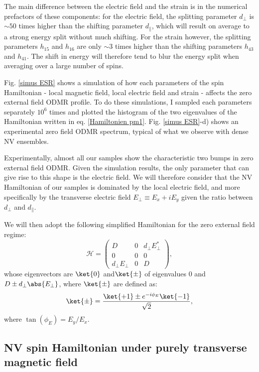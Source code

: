 \documentclass[a4paper,11pt]{report}
\begin{document}
The main difference between the electric field and the strain is in the numerical prefactors of these components: for the electric field, the splitting parameter $d_\perp$ is $\sim 50$ times higher than the shifting parameter $d_\parallel$, which will result on average to a strong energy split without much shifting. For the strain however, the splitting parameters $h_{15}$ and $h_{16}$ are only $\sim 3$ times higher than the shifting parameters $h_{43}$ and $h_{41}$. The shift in energy will therefore tend to blur the energy split when averaging over a large number of spins.

Fig. \ref{simus ESR} shows a simulation of how each parameters of the spin Hamiltonian - local magnetic field, local electric field and strain - affects the zero external field ODMR profile. To do these simulations, I sampled each parameters separately $10^6$ times and plotted the histogram of the two eigenvalues of the Hamiltonian written in eq. \ref{Hamiltonien pm1}. Fig. \ref{simus ESR}-d) shows an experimental zero field ODMR spectrum, typical of what we observe with dense NV ensembles. 

Experimentally, almost all our samples show the characteristic two bumps in zero external field ODMR. Given the simulation results, the only parameter that can give rise to this shape is the electric field. We will therefore consider that the NV Hamiltonian of our samples is dominated by the local electric field, and more specifically by the transverse electric field $E_\perp\equiv E_x + i E_y$ given the ratio between $d_\perp$ and $d_\parallel$.

We will then adopt the following simplified Hamiltonian for the zero external field regime:
\begin{equation}
\mathcal{H}=\begin{pmatrix}
D&0&d_\perp E_\perp^* \\
0&0&0 \\
d_\perp E_\perp &0&D
\end{pmatrix},
\end{equation}
whose eigenvectors are $\ket{0}$ and$\ket{\pm}$ of eigenvalues 0 and $D\pm d_\perp \abs{E_\perp}$, where $\ket{\pm}$ are defined as:
\begin{equation}
\ket{\pm}=\frac{\ket{+1}\pm e^{-i\phi_E}\ket{-1}}{\sqrt{2}},
\end{equation}
where $\tan(\phi_E)=E_y/E_x$.

\subsection{NV spin Hamiltonian under purely transverse magnetic field}
\label{sec B transverse}
\end{document}
